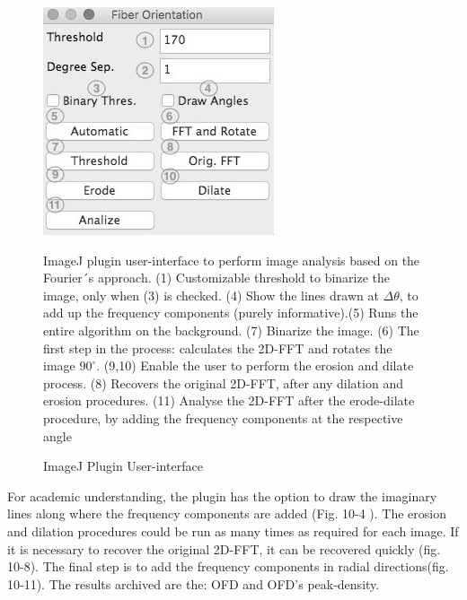 \documentclass[12pt,a4paper]{article}
\begin{document}
\begin{figure}
  \includegraphics[width=\linewidth]{FiguresDisertation/figure10o9.jpg}
  \caption{ImageJ Plugin User-interface}
  \medskip
  \small
  ImageJ plugin user-interface to perform image analysis based on the Fourier´s approach. (1) Customizable threshold to binarize the image, only when (3) is checked. (4) Show the lines drawn at $\Delta\theta$,  to add up the frequency components (purely informative).(5) Runs the entire algorithm on the background. (7) Binarize the image. (6) The first step in the process: calculates the 2D-FFT and rotates the image $90^{\circ}$. (9,10) Enable the user to perform the erosion and dilate process. (8) Recovers the original 2D-FFT, after any dilation and erosion procedures. (11) Analyse the 2D-FFT after the erode-dilate procedure, by adding the frequency components at the respective angle
\end{figure}

For academic understanding, the plugin has the option to draw the imaginary lines along where the frequency components are added (Fig. 10-4 ). The erosion and dilation procedures could be run as many times as required for each image. If it is necessary to recover the original 2D-FFT, it can be recovered quickly (fig. 10-8). The final step is to add the frequency components in radial directions(fig. 10-11). The results archived are the:  OFD and OFD's peak-density. 
\end{document}
